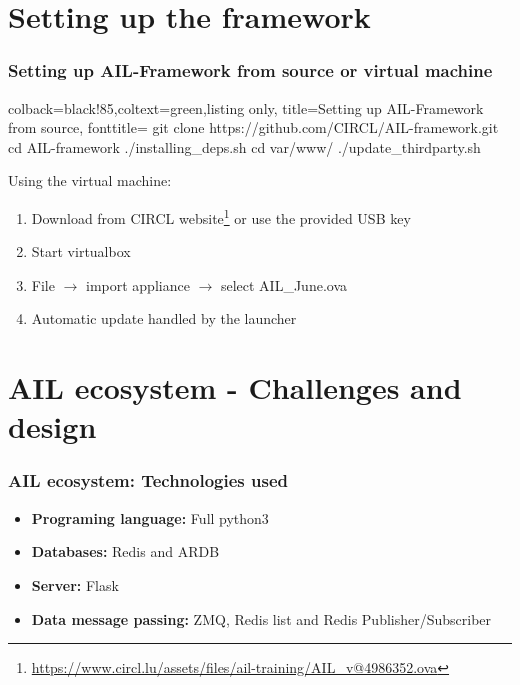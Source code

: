 
\section{Setting up the framework}
\lstset{style=bash}
\begin{frame}[fragile]
    \frametitle{Setting up AIL-Framework from source or virtual machine}
\vspace{-0.2cm}
    \begin{tcblisting}{colback=black!85,coltext=green,listing only,
        title=Setting up AIL-Framework from source, fonttitle=\bfseries}
git clone https://github.com/CIRCL/AIL-framework.git
cd AIL-framework
./installing_deps.sh
cd var/www/
./update_thirdparty.sh
\end{tcblisting}
\vspace{-0.2cm}
Using the virtual machine:
\begin{enumerate}
    \item Download from CIRCL website\footnote{\url{https://www.circl.lu/assets/files/ail-training/AIL\_v@4986352.ova}} or use the provided USB key
    \item Start virtualbox
    \item File $\rightarrow$ import appliance $\rightarrow$ select AIL\_June.ova
    \item Automatic update handled by the launcher
\end{enumerate}
\end{frame}

\section{AIL ecosystem - Challenges and design}
\begin{frame}
    \frametitle{AIL ecosystem: Technologies used}
    \begin{itemize}
        \item[] \textbf{Programing language:} Full python3
        \item[] \textbf{Databases:} Redis and ARDB
        \item[] \textbf{Server:} Flask
        \item[] \textbf{Data message passing:} ZMQ, Redis list and Redis Publisher/Subscriber
    \end{itemize}
\end{frame}

